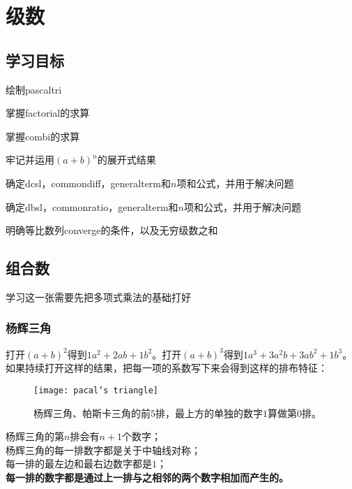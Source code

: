 \chapter{级数}
\label{ch:Series}

\section*{学习目标}
\begin{todolist}
	\item 绘制\gls{pascaltri}
	\item 掌握\gls{factorial}的求算
	\item 掌握\gls{combi}的求算
	\item 牢记并运用$(a+b)^n$的展开式结果
	\item 确定\gls{dcsl}，\gls{commondiff}，\gls{generalterm}和$n$项和公式，并用于解决问题
	\item 确定\gls{dbsl}，\gls{commonratio}，\gls{generalterm}和$n$项和公式，并用于解决问题
	\item 明确等比数列\gls{converge}的条件，以及无穷级数之和
\end{todolist}
\clearpage

\section{组合数}
\label{sec:Combination}
学习这一张需要先把多项式乘法的基础打好

\subsection*{杨辉三角}
\label{subsec:Pascal's Triangle}
打开$(a+b)^2$得到$\boxed{1}a^2+\boxed{2}ab+\boxed{1}b^2$。打开$(a+b)^3$得到$\boxed{1}a^3+\boxed{3}a^2b+\boxed{3}ab^2+\boxed{1}b^3$。如果持续打开这样的结果，把每一项的系数写下来会得到这样的排布特征：
\begin{figure}[H]
\centering
\texttt{[image: pacal's triangle]}
\caption{杨辉三角、帕斯卡三角的前$5$排，最上方的单独的数字$1$算做第$0$排。}
\end{figure}

\begin{SummBox}
\noindent 杨辉三角的第$n$排会有$n+1$个数字；\\
杨辉三角的每一排数字都是关于中轴线对称；\\
每一排的最左边和最右边数字都是$1$；\\
\textbf{每一排的数字都是通过上一排与之相邻的两个数字相加而产生的。}
\end{SummBox}

